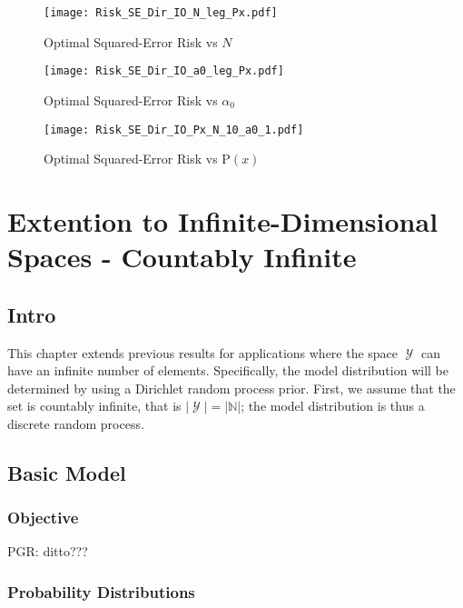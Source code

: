 \documentclass[12pt]{report}
\DeclareMathOperator{\Ycal}{\mathcal{Y}}
\begin{document}
\begin{figure}
\centering
\texttt{[image: Risk\_SE\_Dir\_IO\_N\_leg\_Px.pdf]}
\caption{Optimal Squared-Error Risk vs $N$}
\label{fig:Risk_SE_Dir_IO_N_leg_Px}
\end{figure}

\begin{figure}
\centering
\texttt{[image: Risk\_SE\_Dir\_IO\_a0\_leg\_Px.pdf]}
\caption{Optimal Squared-Error Risk vs $\alpha_0$}
\label{fig:Risk_SE_Dir_IO_a0_leg_Px}
\end{figure}

\begin{figure}
\centering
\texttt{[image: Risk\_SE\_Dir\_IO\_Px\_N\_10\_a0\_1.pdf]}
\caption{Optimal Squared-Error Risk vs $\text{P}(x)$}
\label{fig:Risk_SE_Dir_IO_Px_N_10_a0_1}
\end{figure}








\chapter{Extention to Infinite-Dimensional Spaces - Countably Infinite}


\section{Intro}

This chapter extends previous results for applications where the space $\Ycal$ can have an infinite number of elements. Specifically, the model distribution will be determined by using a Dirichlet random process prior. First, we assume that the set is countably infinite, that is $|\Ycal| = |\mathbb{N}|$; the model distribution is thus a discrete random process. 




\section{Basic Model}


\subsection{Objective}

PGR: ditto???


\subsection{Probability Distributions}
\end{document}
